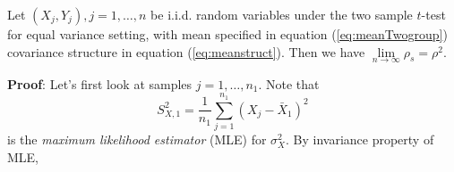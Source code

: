 \begin{lemma}\label{thm:invScorlimit}
	Let $(X_j, Y_j), j = 1, \ldots, n$ be i.i.d. random variables under the two sample $t$-test 
	for equal variance setting, 
	with mean specified in equation (\ref{eq:meanTwogroup}) covariance structure in equation 
	(\ref{eq:meanstruct}). Then we have
	$\lim\limits_{n\rightarrow\infty}\rho_s = \rho^2$.
\end{lemma}
\textbf{Proof}: Let's first look at samples $j=1, \ldots, n_1$. Note that 
\begin{equation}
S_{X,1}^2= \frac{1}{n_1}\sum_{j=1}^{n_1}(X_j -\bar{X}_1)^2
\end{equation}
is the \textit{maximum likelihood estimator} (MLE) for $\sigma_X^2$. By invariance property of 
MLE,
